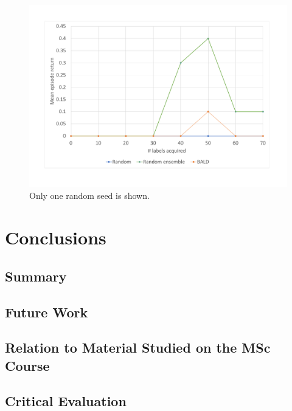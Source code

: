 \documentclass[11pt, a4paper, bibliography=totoc]{report}
\begin{document}
\begin{figure}[h]
	\centering
	\includegraphics[width=\textwidth]{grid_hard}
	\caption{ Only one random seed is shown.}
	\label{fig:grid_hard}
\end{figure}




\chapter{Conclusions}
\section{Summary}
\section{Future Work}
\section{Relation to Material Studied on the MSc Course}
\section{Critical Evaluation}
\end{document}
